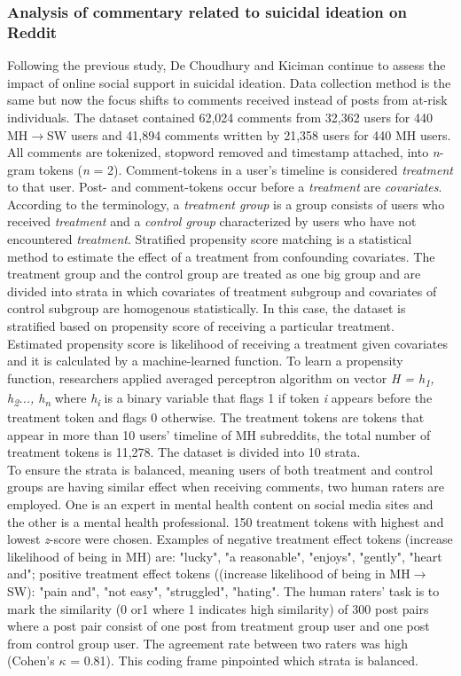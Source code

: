 \subsubsection*{Analysis of commentary related to suicidal ideation on Reddit}
Following the previous study, De Choudhury and Kiciman \cite{DeChoudhury2017} continue to assess the impact of online social support in suicidal ideation. Data collection method is the same but now the focus shifts to comments received instead of posts from at-risk individuals. The dataset contained 62,024 comments from 32,362 users for 440 MH$\rightarrow$SW users and 41,894 comments written by 21,358 users for 440 MH users. All comments are tokenized, stopword removed and timestamp attached, into \textit{n}-gram tokens (\textit{n} = 2). Comment-tokens in a user's timeline is considered \textit{treatment} to that user. Post- and comment-tokens occur before a \textit{treatment} are \textit{covariates}. According to the terminology, a \textit{treatment group} is a group consists of users who received \textit{treatment} and a \textit{control group} characterized by users who have not encountered \textit{treatment}. Stratified propensity score matching is a statistical method to estimate the effect of a treatment from confounding covariates. The treatment group and the control group are treated as one big group and are divided into strata in which covariates of treatment subgroup and covariates of control subgroup are homogenous statistically. In this case, the dataset is stratified based on propensity score of receiving a particular treatment. Estimated propensity score is likelihood of receiving a treatment given covariates and it is calculated by a machine-learned function. To learn a propensity function, researchers applied averaged perceptron algorithm on vector \textit{H = h\textsubscript{1}, h\textsubscript{2}..., h\textsubscript{n}} where \textit{h\textsubscript{i}} is a binary variable that flags 1 if token \textit{i} appears before the treatment token and flags 0 otherwise. The treatment tokens are tokens that appear in more than 10 users' timeline of MH subreddits, the total number of treatment tokens is 11,278. The dataset is divided into 10 strata.\\
To ensure the strata is balanced, meaning users of both treatment and control groups are having similar effect when receiving comments, two human raters are employed. One is an expert in mental health content on social media sites and the other is a mental health professional. 150 treatment tokens with highest and lowest \textit{z}-score were chosen. Examples of negative treatment effect tokens (increase likelihood of being in MH) are: "lucky", "a reasonable", "enjoys", "gently", "heart and"; positive treatment effect tokens ((increase likelihood of being in MH$\rightarrow$SW): "pain and", "not easy", "struggled", "hating". The human raters' task is to mark the similarity (0 or1 where 1 indicates high similarity) of 300 post pairs where a post pair consist of one post from treatment group user and one post from control group user. The agreement rate between two raters was high (Cohen's $\kappa$ = 0.81). This coding frame pinpointed which strata is balanced.\\
